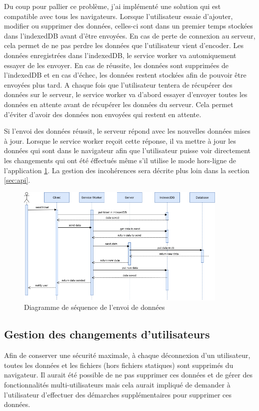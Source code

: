 \documentclass{EPL-master-thesis-covers-FR}
\begin{document}
					Du coup pour pallier ce problème, j'ai implémenté une solution qui est compatible avec tous les navigateurs. Lorsque l'utilisateur essaie d'ajouter, modifier ou supprimer des données, celles-ci sont dans un premier temps stockées dans l'indexedDB avant d'être envoyées. En cas de perte de connexion au serveur, cela permet de ne pas perdre les données que l'utilisateur vient d'encoder. Les données enregistrées dans l'indexedDB, le service worker va automiquement essayer de les envoyer. En cas de réussite, les données sont supprimées de l'indexedDB et en cas d'échec, les données restent stockées afin de pouvoir être envoyées plus tard. A chaque fois que l'utilisateur tentera de récupérer des données  sur le serveur, le service worker va d'abord essayer d'envoyer toutes les données en attente avant de récupérer les données du serveur. Cela permet d'éviter d'avoir des données non envoyées qui restent en attente.
					
					Si l'envoi des données réussit, le serveur répond avec les nouvelles données mises à jour. Lorsque le service worker reçoit cette réponse, il va mettre à jour les données qui sont dans le navigateur afin que l'utilisateur puisse voir directement les changements qui ont été éffectués même s'il utilise le mode hors-ligne de l'application \ref{fig:flows2}. La gestion des incohérences sera décrite plus loin dans la section \ref{sec:api}.
					
					\begin{figure}[H]
						\centering
						\includegraphics[width=0.9\textwidth]{images/flow2}
						\caption{Diagramme de séquence de l'envoi de données}
						\label{fig:flows2}
					\end{figure}
			
			\subsection*{Gestion des changements d'utilisateurs}		
				Afin de conserver une sécurité maximale, à chaque déconnexion d'un utilisateur, toutes les données et les fichiers (hors fichiers statiques) sont supprimés du navigateur. Il aurait été possible de ne pas supprimer ces données et de gérer des fonctionnalités multi-utilisateurs mais cela aurait impliqué de demander à l'utilisateur d'effectuer des démarches supplémentaires pour supprimer ces données. 
			
\end{document}
